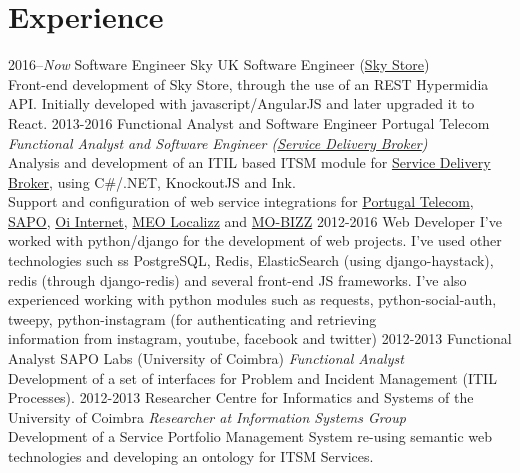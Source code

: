 \documentclass[]{friggeri-cv} %
\begin{document}
\section{Experience}

\begin{entrylist}
\entry
{2016--\emph{Now}}
{Software Engineer}
{Sky UK}
{Software Engineer (\href{https://www.skystore.com/}{Sky Store})\\
Front-end development of Sky Store, through the use of an REST Hypermidia API. Initially developed with javascript/AngularJS and later upgraded it to \\React.}
\entry
{2013-2016}
{Functional Analyst and Software Engineer}
{Portugal Telecom}
{\emph{Functional Analyst and Software Engineer (\href{http://sdb.sapo.pt/en/index.html}{Service Delivery Broker})}\\
Analysis and development of an ITIL based ITSM module for \href{http://sdb.sapo.pt/en/index.html}{Service Delivery Broker}, using C\#/.NET, KnockoutJS and Ink.\\
Support and configuration of web service integrations for \href{http://www.telecom.pt/InternetResource/PTSite/PT}{Portugal Telecom}, \href{http://www.sapo.pt/}{SAPO}, \href{http://www.oi.com.br/}{Oi Internet}, \href{https://meolocalizz.meo.pt}{MEO Localizz} and \href{http://www2.mobizz-project.eu/}{MO-BIZZ}}
\entry
{2012-2016}
{Web Developer}
{}
{I’ve worked with python/django for the development of web projects. I’ve used other technologies such ss PostgreSQL, Redis, ElasticSearch (using django-haystack), redis (through django-redis) and several front-end JS frameworks. I’ve also experienced working with python modules such as requests, python-social-auth, tweepy, python-instagram (for authenticating and retrieving \\information from instagram, youtube, facebook and twitter)}
\entry
{2012-2013}
{Functional Analyst}
{SAPO Labs (University of Coimbra)}
{\emph{Functional Analyst}\\
Development of a set of interfaces for Problem and Incident Management (ITIL Processes).}
\entry
{2012-2013}
{Researcher}
{Centre for Informatics and Systems of the University of Coimbra}
{\emph{Researcher at Information Systems Group}\\
Development of a Service Portfolio Management System re-using semantic web technologies and developing an ontology for ITSM Services.}

\end{entrylist}
\end{document}
